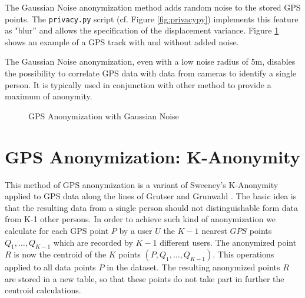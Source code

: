 The Gaussian Noise anonymization method adds random noise to the
stored GPS points. The \texttt{privacy.py} script (cf. Figure
\ref{fig:privacypy}) implements this feature as "blur'' and allows the
specification of the displacement variance.  Figure \ref{fig:noise}
shows an example of a GPS track with and without added noise.

The Gaussian Noise anonymization, even with a low noise radius of 5m,
disables the possibility to correlate GPS data with data from cameras
to identify a single person. It is typically used in conjunction with
other method to provide a maximum of anonymity.

\begin{figure}
  \centering
  \quad
  \caption{GPS Anonymization with Gaussian Noise}
  \label{fig:noise}
\end{figure}

\section{GPS Anonymization: K-Anonymity}
This method of GPS anonymization is a variant of Sweeney's K-Anonymity
\cite{sweeney2002k} applied to GPS data along the lines of Grutser and
Grunwald \cite{Gruteser2003}.  The basic idea is that the resulting
data from a single person should not distinguishable form data from
K-1 other persons. In order to achieve such kind of anonymization we
calculate for each GPS point $P$ by a user $U$ the $K-1$ nearest $GPS$
points $Q_1, \dots, Q_{K-1}$ which are recorded by $K-1$ different
users.  The anonymized point $R$ is now the centroid of the $K$ points
$(P,Q_1,\dots,Q_{K-1})$. This operations applied to all data points
$P$ in the dataset. The resulting anonymized points $R$ are stored in
a new table, so that these points do not take part in further the
centroid calculations.

